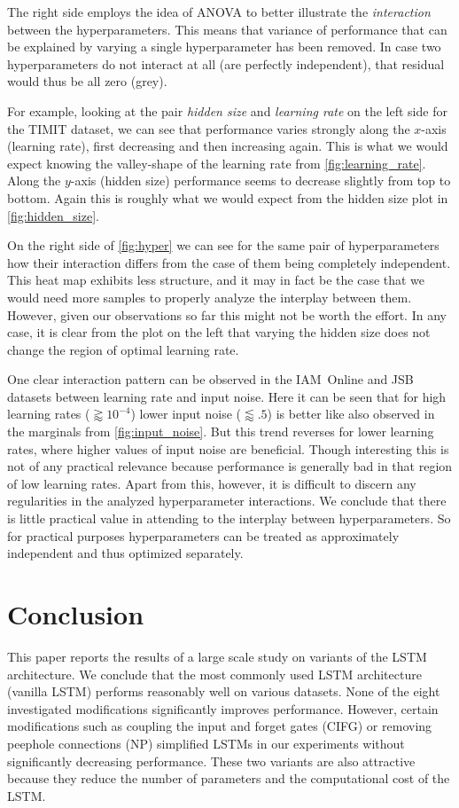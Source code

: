 The right side employs the idea of ANOVA to better illustrate the \emph{interaction} between the hyperparameters. This means that variance of performance that can be explained by varying a single hyperparameter has been removed. In case two hyperparameters do not interact at all (are perfectly independent), that residual would thus be all zero (grey).

For example, looking at the pair \emph{hidden size} and \emph{learning rate} on the left side for the TIMIT dataset, we can see that performance varies strongly along the $x$-axis (learning rate), first decreasing and then increasing again. This is what we would expect knowing the valley-shape of the learning rate from \autoref{fig:learning_rate}.
Along the $y$-axis (hidden size) performance seems to decrease slightly from top to bottom. Again this is roughly what we would expect from the hidden size plot in  \autoref{fig:hidden_size}. 

On the right side of \autoref{fig:hyper} we can see for the same pair of hyperparameters how their interaction differs from the case of them being completely independent. This heat map exhibits less structure, and it may in fact be the case that we would need more samples to properly analyze the interplay between them. However, given our observations so far this might not be worth the effort. In any case, it is clear from the plot on the left that varying the hidden size does not change the region of optimal learning rate.

One clear interaction pattern can be observed in the IAM~Online and JSB datasets between learning rate and input noise. Here it can be seen that for high learning rates ($\gtrapprox10^{-4}$) lower input noise ($\lessapprox.5$) is better like also observed in the marginals from \autoref{fig:input_noise}.
But this trend reverses for lower learning rates, where higher values of input noise are beneficial. Though interesting this is not of any practical relevance because performance is generally bad in that region of low learning rates. Apart from this, however, it is difficult to discern any regularities in the analyzed hyperparameter interactions. We conclude that there is little practical value in attending to the interplay between hyperparameters. So for practical purposes hyperparameters can be treated as approximately independent and thus optimized separately.

\section{Conclusion}
This paper reports the results of a large scale study on variants of the LSTM architecture. We conclude that the most commonly used LSTM architecture (vanilla LSTM) performs reasonably well on various datasets. None of the eight investigated modifications significantly improves performance. However, certain modifications such as coupling the input and forget gates (CIFG) or removing peephole connections (NP) simplified LSTMs in our experiments without significantly decreasing performance. These two variants are also attractive because they reduce the number of parameters and the computational cost of the LSTM.

